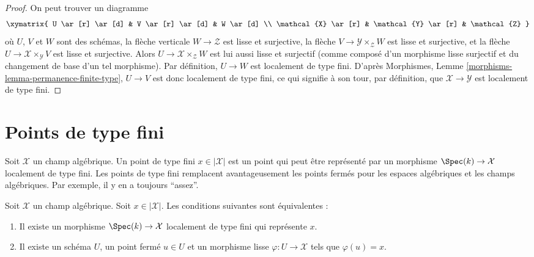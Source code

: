 \begin{proof}
On peut trouver un diagramme
$$
\xymatrix{
U \ar[r] \ar[d] & V \ar[r] \ar[d] & W \ar[d] \\
\mathcal{X} \ar[r] & \mathcal{Y} \ar[r] & \mathcal{Z}
}
$$
où $U$, $V$ et $W$ sont des schémas, la flèche verticale
$W \to \mathcal{Z}$ est lisse et surjective, la flèche
$V \to \mathcal{Y} \times_\mathcal{Z} W$ est lisse et surjective,
et la flèche $U \to \mathcal{X} \times_\mathcal{Y} V$ est lisse et
surjective. Alors $U \to \mathcal{X} \times_\mathcal{Z} W$ est lui aussi
lisse et surjectif (comme composé d'un morphisme lisse surjectif et du
changement de base d'un tel morphisme). Par définition, $U \to W$ est
localement de type fini. D'après Morphismes, Lemme
\ref{morphisms-lemma-permanence-finite-type}, $U \to V$ est donc
localement de type fini, ce qui signifie à son tour, par définition,
que $\mathcal{X} \to \mathcal{Y}$ est localement de type fini.
\end{proof}










\section{Points de type fini}
\label{section-points-finite-type}

\noindent
Soit $\mathcal{X}$ un champ algébrique.
Un point de type fini $x \in |\mathcal{X}|$ est un point qui peut être représenté
par un morphisme $\Spec(k) \to \mathcal{X}$ localement de type fini.
Les points de type fini remplacent avantageusement les points fermés pour les
espaces algébriques et les champs algébriques. Par exemple, il y en a toujours
``assez''.

\begin{lemma}
\label{lemma-point-finite-type}
Soit $\mathcal{X}$ un champ algébrique.
Soit $x \in |\mathcal{X}|$. Les conditions suivantes sont équivalentes :
\begin{enumerate}
\item Il existe un morphisme $\Spec(k) \to \mathcal{X}$
localement de type fini qui représente $x$.
\item Il existe un schéma $U$, un point fermé $u \in U$ et un morphisme
lisse $\varphi : U \to \mathcal{X}$ tels que $\varphi(u) = x$.
\end{enumerate}
\end{lemma}

